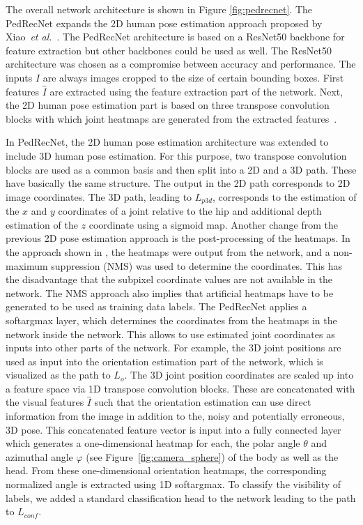 \documentclass[a4paper, 10pt, conference]{ieeeconf}
\begin{document}
The overall network architecture is shown in Figure \ref{fig:pedrecnet}. The PedRecNet expands the 2D human pose estimation approach proposed by Xiao~\textit{et al.}~\cite{xiaoSimpleBaselinesHuman2018}. The PedRecNet architecture is based on a ResNet50 backbone for feature extraction but other backbones could be used as well. The ResNet50 architecture was chosen as a compromise between accuracy and performance. The inputs $I$ are always images cropped to the size of certain bounding boxes. First features $\hat{I}$ are extracted using the feature extraction part of the network. Next, the 2D human pose estimation part is based on three transpose convolution blocks with which joint heatmaps are generated from the extracted features~\cite{xiaoSimpleBaselinesHuman2018}. 

In PedRecNet, the 2D human pose estimation architecture was extended to include 3D human pose estimation. For this purpose, two transpose convolution blocks are used as a common basis and then split into a 2D and a 3D path. These have basically the same structure. The output in the 2D path corresponds to 2D image coordinates. The 3D path, leading to $L_{p3d}$, corresponds to the estimation of the $x$ and $y$ coordinates of a joint relative to the hip and additional depth estimation of the $z$ coordinate using a sigmoid map. Another change from the previous 2D pose estimation approach is the post-processing of the heatmaps. In the approach shown in \cite{ludlSimpleEfficientRealtime2019}, the heatmaps were output from the network, and a non-maximum suppression (NMS) was used to determine the coordinates. This has the disadvantage that the subpixel coordinate values are not available in the network. The NMS approach also implies that artificial heatmaps have to be generated to be used as training data labels. The PedRecNet applies a softargmax layer, which determines the coordinates from the heatmaps in the network inside the network. This allows to use estimated joint coordinates as inputs into other parts of the network. For example, the 3D joint positions are used as input into the orientation estimation part of the network, which is visualized as the path to $L_{o}$. The 3D joint position coordinates are scaled up into a feature space via 1D transpose convolution blocks. These are concatenated with the visual features $\hat{I}$ such that the orientation estimation can use direct information from the image in addition to the, noisy and potentially erroneous, 3D pose. This concatenated feature vector is input into a fully connected layer which generates a one-dimensional heatmap for each, the polar angle $\theta$ and azimuthal angle $\varphi$ (see Figure~\ref{fig:camera_sphere}) of the body as well as the head. From these one-dimensional orientation heatmaps, the corresponding normalized angle is extracted using 1D softargmax. To classify the visibility of labels, we added a standard classification head to the network leading to the path to $L_{conf}$.
\end{document}
